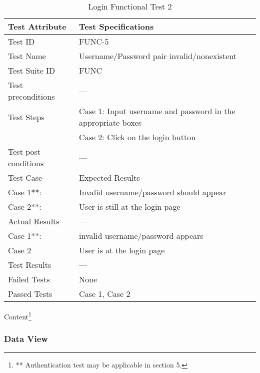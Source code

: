 \documentclass{article}
\begin{document}
\begin{table}[htbp]
\begin{center}
\begin{tabular}{|l | l|}
\hline
Test Attribute & Test Specifications \\
\hline
Test ID & FUNC-5 \\
\hline
Test Name  & Username/Password pair invalid/nonexistent \\
\hline
Test Suite  ID & FUNC \\
\hline
Test preconditions & --- \\
\hline
Test Steps & Case 1: Input username and password in the appropriate boxes \\
\hline
  & Case 2: Click on the login button \\
\hline
Test post conditions & --- \\
\hline
Test Case & Expected Results\\
\hline
Case 1**:  &  Invalid username/password should appear\\
\hline
Case 2**: &  User is still at the login page  \\
\hline
Actual Results & ---\\
\hline
Case 1**:  &  invalid username/password appears\\
\hline
Case 2 &  User is at the login page  \\
\hline
Test Results & ---\\
\hline
Failed Tests & None\\
\hline
Passed Tests & Case 1, Case 2\\
\hline
\end{tabular}
\end{center}
\caption{Login Functional Test 2}
Content\footnote{** Authentication test may be applicable in section 5.}
\end{table}
\label{table:2e}

\clearpage

\subsubsection{Data View}
\end{document}

